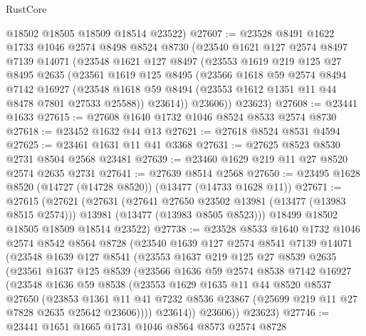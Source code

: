 \begin{lexlean}{RustCore}
\begin{coremodule}
      @18502
      @18505
      @18509
      @18514
      @23522)
@27607 := @23528
    @8491
    @1622
    @1733
    @1046
    @2574
    @8498
    @8524
    @8730
    (@23540
      @1621
      @127
      @2574
      @8497
      @7139
      @14071
      (@23548
        @1621
        @127
        @8497
        (@23553
          @1619
          @219
          @125
          @27
          @8495
          @2635
          (@23561
            @1619
            @125
            @8495
            (@23566
              @1618
              @59
              @2574
              @8494
              @7142
              @16927
              (@23548 @1618 @59 @8494 (@23553 @1612 @1351 @11 @44 @8478 @7801 @27533 @25588))
              @23614))
          @23606))
      @23623)
@27608 := @23441 @1633
@27615 := @27608 @1640 @1732 @1046 @8524 @8533 @2574 @8730
@27618 := @23452 @1632 @44 @13
@27621 := @27618 @8524 @8531 @4594
@27625 := @23461 @1631 @11 @41 @3368
@27631 := @27625 @8523 @8530 @2731 @8504 @2568 @23481
@27639 := @23460 @1629 @219 @11 @27 @8520 @2574 @2635 @2731
@27641 := @27639 @8514 @2568
@27650 := @23495 @1628 @8520 (@14727 (@14728 @8520)) (@13477 (@14733 @1628 @11))
@27671 := @27615
    (@27621
      (@27631
        (@27641 @27650 @23502 @13981 (@13477 (@13983 @8515 @2574)))
        @13981
        (@13477 (@13983 @8505 @8523)))
      @18499
      @18502
      @18505
      @18509
      @18514
      @23522)
@27738 := @23528
    @8533
    @1640
    @1732
    @1046
    @2574
    @8542
    @8564
    @8728
    (@23540
      @1639
      @127
      @2574
      @8541
      @7139
      @14071
      (@23548
        @1639
        @127
        @8541
        (@23553
          @1637
          @219
          @125
          @27
          @8539
          @2635
          (@23561
            @1637
            @125
            @8539
            (@23566
              @1636
              @59
              @2574
              @8538
              @7142
              @16927
              (@23548
                @1636
                @59
                @8538
                (@23553
                  @1629
                  @1635
                  @11
                  @44
                  @8520
                  @8537
                  @27650
                  (@23853
                    @1361
                    @11
                    @41
                    @7232
                    @8536
                    @23867
                    (@25699 @219 @11 @27 @7828 @2635 @25642 @23606))))
              @23614))
          @23606))
      @23623)
@27746 := @23441 @1651 @1665 @1731 @1046 @8564 @8573 @2574 @8728

\end{coremodule}
\end{lexlean}
